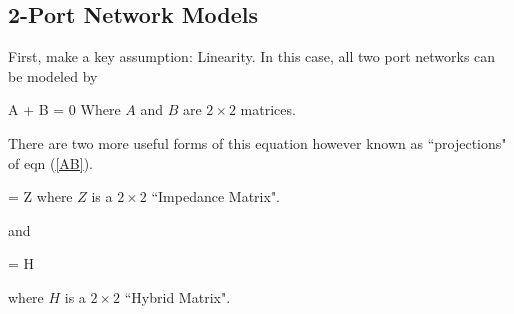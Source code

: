 \subsection{2-Port Network Models}

First, make a key assumption:  Linearity.   In this case, all two port networks can be modeled by	%

\bq \label{AB}
A  \left [
   \begin{array}{c} \fl_1 \\ \fl_2  \end{array}
   \right]
+
B  \left [
   \begin{array}{c} \ef_1 \\ \ef_2  \end{array}
   \right]
=
0
\eq
Where $A$ and $B$ are $2\times2$ matrices.


There are two more useful forms of this equation however known as ``projections" of eqn (\ref{AB}).	%


\bq\label{ZMatrixDef}
   \left [
   \begin{array}{c} \ef_1 \\ \ef_2  \end{array}
   \right]
=
Z  \left [
   \begin{array}{c} \fl_1 \\ \fl_2  \end{array}
   \right]
\eq
where $Z$ is a $2\times2$ ``Impedance Matrix".

and



\bq\label{HMatrixDef}
   \left [
   \begin{array}{c} \ef_1 \\ \fl_2  \end{array}
   \right]
=
H  \left [
   \begin{array}{c} \fl_1 \\ \ef_2  \end{array}
   \right]
\eq

where $H$ is a $2\times2$ ``Hybrid Matrix".



